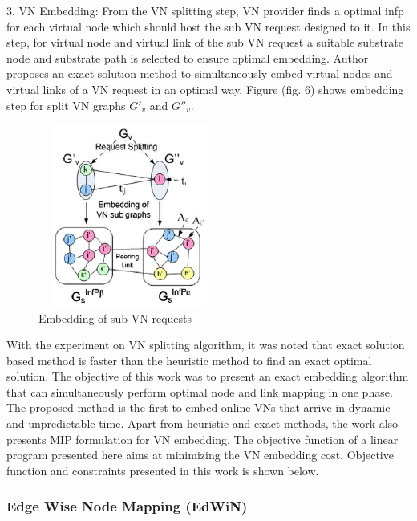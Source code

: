\documentclass[article,dr=phil,type=msc ,colorback,accentcolor=tud4b]{tudthesis}
\begin{document}
3. VN Embedding: From the VN splitting step, VN provider finds a optimal infp for each virtual node which should host the sub VN request designed to it. In this step, for virtual node and virtual link of the sub VN request a suitable substrate node and substrate path is selected to ensure optimal embedding. Author proposes an exact solution method to simultaneously embed virtual nodes and virtual links of a VN request in an optimal way. Figure (fig. 6) shows embedding step for split VN graphs $G'_{v}$ and $G''_{v}$.

\begin{figure}[h]
	\centering
	\includegraphics[width=6cm, height=6cm]{vn_embedding.jpg}
	\caption{Embedding of sub VN requests}
	\label{fig: VN embedding}
\end{figure}

With the experiment on VN splitting algorithm, it was noted that exact solution based method is faster than the heuristic method to find an exact optimal solution. The objective of this work was to present an exact embedding algorithm that can simultaneously perform optimal node and link mapping in one phase. The proposed method is the first to embed online VNs that arrive in dynamic and unpredictable time. Apart from heuristic and exact methods, the work also presents MIP formulation for VN embedding. The objective function of a linear program presented here aims at minimizing the VN embedding cost. Objective function and constraints presented in this work is shown below.


\subsubsection{Edge Wise Node Mapping (EdWiN)} \label{edwin}
\end{document}
